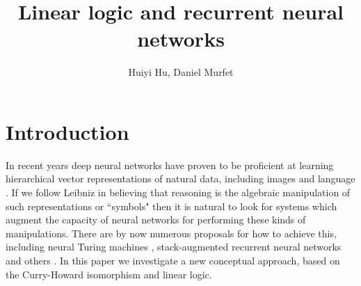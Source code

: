 \documentclass[english,letter paper,12pt,leqno]{article}
\theoremstyle{example}
\numberwithin{equation}{section}
\def\res{\operatorname{Res}}
\begin{document}
\def\Res{\res\!}
\newcommand{\ud}{\mathrm{d}}
\newcommand{\Ress}[1]{\res_{#1}\!}
\newcommand{\cat}[1]{\mathcal{#1}}
\newcommand{\lto}{\longrightarrow}
\newcommand{\xlto}[1]{\stackrel{#1}\lto}
\newcommand{\mf}[1]{\mathfrak{#1}}
\newcommand{\md}[1]{\mathscr{#1}}
\def\sus{\l}
\def\l{\,|\,}
\def\sgn{\textup{sgn}}
\newcommand{\den}[1]{\llbracket #1 \rrbracket}
\def\inta{\textbf{int}}
\def\binta{\textbf{bint}}
\def\comp{\underline{\textup{comp}}}
\def\mult{\underline{\textup{mult}}}
\def\repeat{\underline{\textup{repeat}}}
\def\master{\underline{\textup{master}}}

\DeclarePairedDelimiter\bra{\langle}{\rvert}
\DeclarePairedDelimiter\ket{\lvert}{\rangle}

\title{Linear logic and recurrent neural networks}
\author{Huiyi Hu, Daniel Murfet}

\maketitle

\section{Introduction}

In recent years deep neural networks have proven to be proficient at learning hierarchical vector representations of natural data, including images and language \cite{dlnature}. If we follow Leibniz \cite{frege} in believing that reasoning is the algebraic manipulation of such representations or ``symbols" then it is natural to look for systems which augment the capacity of neural networks for performing these kinds of manipulations. There are by now numerous proposals for how to achieve this, including neural Turing machines \cite{ntm}, stack-augmented recurrent neural networks \cite{joulin} and others \cite{graves_etal, grefen, weston, tarlow}. In this paper we investigate a new conceptual approach, based on the Curry-Howard isomorphism and linear logic.
\end{document}
